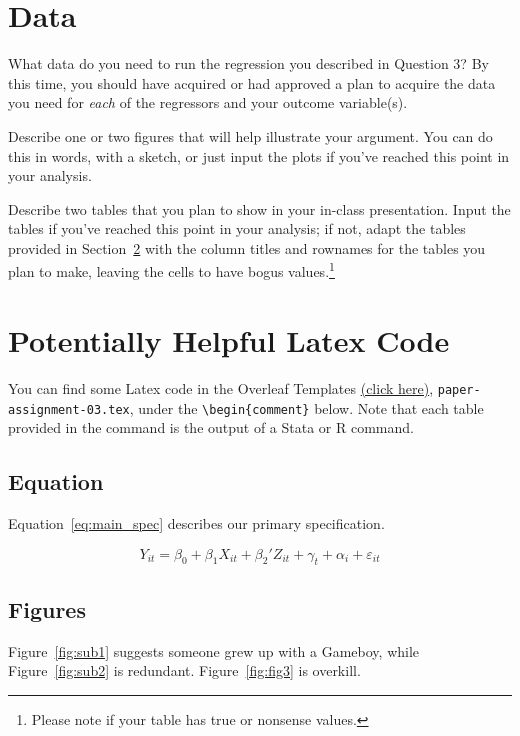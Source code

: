 \section{Data}
What data do you need to run the regression you described in Question 3? By this time, you should have acquired or had approved a plan to acquire the data you need for \textit{each} of the regressors and your outcome variable(s).

Describe one or two figures that will help illustrate your argument. You can do this in words, with a sketch, or just input the plots if you’ve reached this point in your analysis.

Describe two tables that you plan to show in your in-class presentation. Input the tables if you’ve reached this point in your analysis; if not, adapt the tables provided in Section~\ref{sec:latex_code} with the column titles and rownames for the tables you plan to make, leaving the cells to have bogus values.\footnote{Please note if your table has true or nonsense values.}


\section{Potentially Helpful Latex Code}\label{sec:latex_code}
You can find some Latex code in the Overleaf Templates \href{https://www.overleaf.com/read/mpdhvnnjzsxq}{(click here)}, \verb+paper-assignment-03.tex+, under the \verb+\begin{comment}+ below. Note that each table provided in the \verb++ command is the output of a Stata or R command.


\subsection{Equation}
Equation~\ref{eq:main_spec} describes our primary specification.

\begin{equation}\label{eq:main_spec}
    Y_{it} = \beta_0 + \beta_1 X_{it} + \beta_2' Z_{it} + \gamma_t + \alpha_i + \varepsilon_{it}
\end{equation}

\subsection{Figures}

Figure~\ref{fig:sub1} suggests someone grew up with a Gameboy, while Figure~\ref{fig:sub2} is redundant. Figure~\ref{fig:fig3} is overkill.

